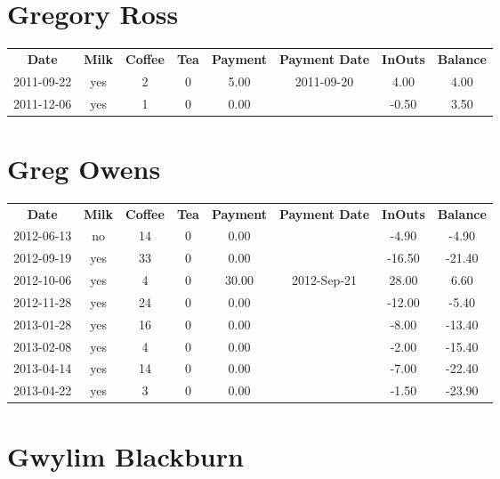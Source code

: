 \section{Gregory Ross}

\begin{center}
\begin{tabular}{cccccccc}
\textbf{Date} & \textbf{Milk} & \textbf{Coffee} & \textbf{Tea} & \textbf{Payment} & \textbf{Payment Date} & \textbf{InOuts} & \textbf{Balance} \\
2011-09-22 & yes & 2 & 0 & 5.00 & 2011-09-20 &  4.00 & 4.00\\ 
2011-12-06 & yes & 1 & 0 & 0.00 &  & -0.50 & 3.50
\end{tabular}
\end{center}

\section{Greg Owens}

\begin{center}
\begin{tabular}{cccccccc}
\textbf{Date} & \textbf{Milk} & \textbf{Coffee} & \textbf{Tea} & \textbf{Payment} & \textbf{Payment Date} & \textbf{InOuts} & \textbf{Balance} \\
2012-06-13 & no & 14 & 0 &  0.00 &  &  -4.90 &  -4.90\\ 
2012-09-19 & yes & 33 & 0 &  0.00 &  & -16.50 & -21.40\\ 
2012-10-06 & yes &  4 & 0 & 30.00 & 2012-Sep-21 &  28.00 &   6.60\\ 
2012-11-28 & yes & 24 & 0 &  0.00 &  & -12.00 &  -5.40\\ 
2013-01-28 & yes & 16 & 0 &  0.00 &  &  -8.00 & -13.40\\ 
2013-02-08 & yes &  4 & 0 &  0.00 &  &  -2.00 & -15.40\\ 
2013-04-14 & yes & 14 & 0 &  0.00 &  &  -7.00 & -22.40\\ 
2013-04-22 & yes &  3 & 0 &  0.00 &  &  -1.50 & -23.90
\end{tabular}
\end{center}

\section{Gwylim Blackburn}

